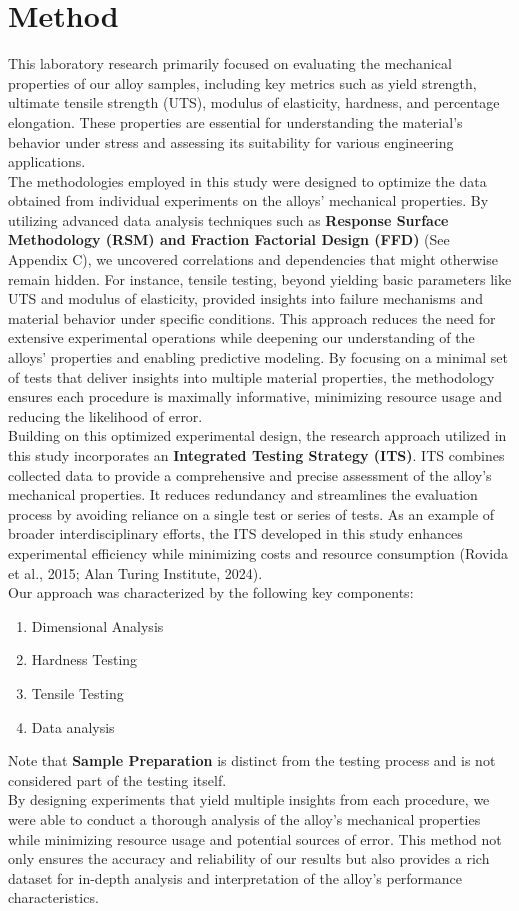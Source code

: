 \documentclass{article}
\begin{document}
\section{Method}
This laboratory research primarily focused on evaluating the mechanical properties of our alloy samples, including key metrics such as yield strength, ultimate tensile strength (UTS), modulus of elasticity, hardness, and percentage elongation. These properties are essential for understanding the material's behavior under stress and assessing its suitability for various engineering applications.\\[8pt]
The methodologies employed in this study were designed to optimize the data obtained from individual experiments on the alloys' mechanical properties. By utilizing advanced data analysis techniques such as \textbf{Response Surface Methodology (RSM) and Fraction Factorial Design (FFD)} (See Appendix C), we uncovered correlations and dependencies that might otherwise remain hidden. For instance, tensile testing, beyond yielding basic parameters like UTS and modulus of elasticity, provided insights into failure mechanisms and material behavior under specific conditions. This approach reduces the need for extensive experimental operations while deepening our understanding of the alloys' properties and enabling predictive modeling. By focusing on a minimal set of tests that deliver insights into multiple material properties, the methodology ensures each procedure is maximally informative, minimizing resource usage and reducing the likelihood of error.\\[8pt]
Building on this optimized experimental design, the research approach utilized in this study incorporates an \textbf{Integrated Testing Strategy (ITS)}. ITS combines collected data to provide a comprehensive and precise assessment of the alloy's mechanical properties. It reduces redundancy and streamlines the evaluation process by avoiding reliance on a single test or series of tests. As an example of broader interdisciplinary efforts, the ITS developed in this study enhances experimental efficiency while minimizing costs and resource consumption (Rovida et al., 2015; Alan Turing Institute, 2024).\\[8pt]
Our approach was characterized by the following key components:
\begin{enumerate}[itemsep=-0.5mm]
    \item {Dimensional Analysis}
    \item {Hardness Testing}
    \item {Tensile Testing} 
    \item {Data analysis}
\end{enumerate}
Note that \textbf{Sample Preparation} is distinct from the testing process and is not considered part of the testing itself.\\[8pt]
By designing experiments that yield multiple insights from each procedure, we were able to conduct a thorough analysis of the alloy's mechanical properties while minimizing resource usage and potential sources of error. This method not only ensures the accuracy and reliability of our results but also provides a rich dataset for in-depth analysis and interpretation of the alloy's performance characteristics.
\newpage
\end{document}
